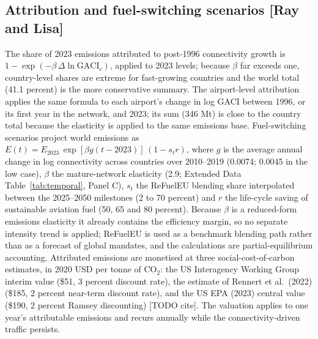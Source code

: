 \documentclass[12pt]{extarticle}
\begin{document}
\subsection*{Attribution and fuel-switching scenarios [Ray and Lisa]}
The share of 2023 emissions attributed to post-1996 connectivity growth is
$1 - \exp(-\beta\,\Delta \ln \mathrm{GACI}_c)$, applied to 2023 levels;
because $\beta$ far exceeds one, country-level shares are extreme for
fast-growing countries and the world total (41.1 percent) is the more
conservative summary. The airport-level attribution applies the same
formula to each airport's change in log GACI between 1996, or its first
year in the network, and 2023; its sum (346 Mt) is close to the country
total because the elasticity is applied to the same emissions base. Fuel-switching scenarios project world emissions as
$E(t) = E_{2023}\,\exp[\beta g (t-2023)]\,(1 - s_t r)$, where $g$ is the
average annual change in log connectivity across countries over
2010--2019 (0.0074; 0.0045 in the low case), $\beta$ the mature-network
elasticity (2.9; Extended Data Table~\ref{tab:temporal}, Panel C), $s_t$
the ReFuelEU blending share interpolated between the 2025--2050 milestones
(2 to 70 percent) and $r$ the life-cycle saving of sustainable aviation
fuel (50, 65 and 80 percent). Because $\beta$ is a reduced-form emissions
elasticity it already contains the efficiency margin, so no separate
intensity trend is applied; ReFuelEU is used as a benchmark blending path
rather than as a forecast of global mandates, and the calculations are
partial-equilibrium accounting. Attributed emissions are monetised at three
social-cost-of-carbon estimates, in 2020 USD per tonne of CO$_2$: the US
Interagency Working Group interim value (\$51, 3 percent discount rate),
the estimate of Rennert et al.\ (2022) (\$185, 2 percent near-term
discount rate), and the US EPA (2023) central value (\$190, 2 percent
Ramsey discounting) [TODO cite]. The valuation applies to one year's
attributable emissions and recurs annually while the connectivity-driven
traffic persists.

\end{document}
